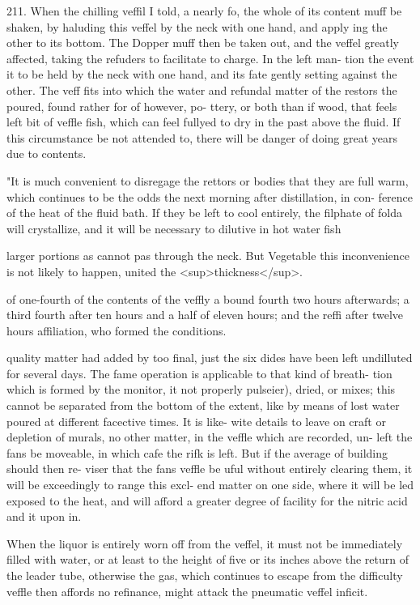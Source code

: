 \documentclass{article}
\begin{document}
211. When the chilling veffil I told, a nearly
fo, the whole of its content muff be shaken, by haluding
this veffel by the neck with one hand, and apply
ing the other to its bottom. The Dopper muff then
be taken out, and the veffel greatly affected, taking
the refuders to facilitate to charge. In the left man-
tion the event it to be held by the neck with one hand,
and its fate gently setting against the other. The veff
fits into which the water and refundal matter of the
restors the poured, found rather for of however, po-
ttery, or both than if wood, that feels left bit of veffle
fish, which can feel fullyed to dry in the past above the
fluid. If this circumstance be not attended to, there
will be danger of doing great years due to contents.

"It is much convenient to disregage the rettors or
bodies that they are full warm, which continues to
be the odds the next morning after distillation, in con-
ference of the heat of the fluid bath. If they be left
to cool entirely, the filphate of folda will crystallize,
and it will be necessary to dilutive in hot water fish

larger portions as cannot pas through the neck. But Vegetable
this inconvenience is not likely to happen, united the <sup>thickness</sup>.

of one-fourth of the contents of the veffly a bound
fourth two hours afterwards; a third fourth after ten
hours and a half of eleven hours; and the reffi after
twelve hours affiliation, who formed the conditions.

quality matter had added by too final, just the six
dides have been left undilluted for several days. The
fame operation is applicable to that kind of breath-
tion which is formed by the monitor, it not properly
pulseier), dried, or mixes; this cannot be separated
from the bottom of the extent, like by means of lost
water poured at different facective times. It is like-
wite details to leave on craft or depletion of murals,
no other matter, in the veffle which are recorded, un-
left the fans be moveable, in which cafe the rifk is
left. But if the average of building should then re-
viser that the fans veffle be uful without entirely
clearing them, it will be exceedingly to range this excl-
end matter on one side, where it will be led exposed
to the heat, and will afford a greater degree of facility
for the nitric acid and it upon in.

When the liquor is entirely worn off from the
veffel, it must not be immediately filled with water, or at least to the height of five or its inches above the
return of the leader tube, otherwise the gas, which
continues to escape from the difficulty veffle then
affords no refinance, might attack the pneumatic veffel
inficit.
\end{document}
